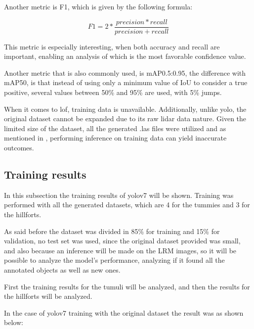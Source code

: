 Another metric is F1, which is given by the following formula:

\begin{equation}
     F1 = 2 * \frac{precision * recall}{precision + recall}
\end{equation}

This metric is especially interesting, when both accuracy and recall are important, enabling an analysis of which is the most favorable confidence value.

Another metric that is also commonly used, is mAP0.5:0.95, the difference with mAP50, is that instead of using only a minimum value of IoU to consider a true positive, several values between 50\% and 95\% are used, with 5\% jumps.

When it comes to lof, training data is unavailable. Additionally, unlike yolo, the original dataset cannot be expanded due to its raw lidar data nature. Given the limited size of the dataset, all the generated .las files were utilized and as mentioned in \cite{lof}, performing inference on training data can yield inaccurate outcomes.

\subsection{Training results}
In this subsection the training results of yolov7 will be shown. Training was performed with all the generated datasets, which are 4 for the tummies and 3 for the hillforts.

As said before the dataset was divided in 85\% for training and 15\% for validation, no test set was used, since the original dataset provided was small, and also because an inference will be made on the LRM images, so it will be possible to analyze the model's performance, analyzing if it found all the annotated objects as well as new ones.

First the training results for the tumuli will be analyzed, and then the results for the hillforts will be analyzed.

In the case of yolov7 training with the original dataset the result was as shown below:

